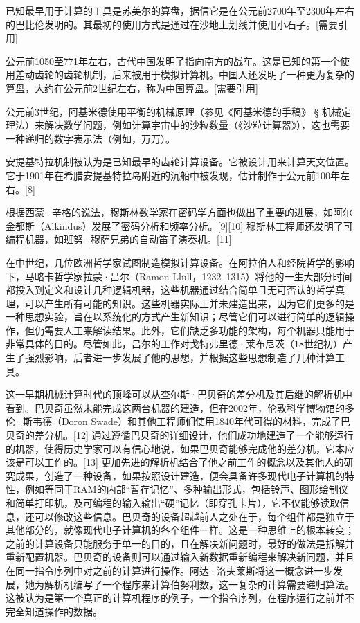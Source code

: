 已知最早用于计算的工具是苏美尔的算盘，据信它是在公元前2700年至2300年左右的巴比伦发明的。其最初的使用方式是通过在沙地上划线并使用小石子。[需要引用]

公元前1050至771年左右，古代中国发明了指向南方的战车。这是已知的第一个使用差动齿轮的齿轮机制，后来被用于模拟计算机。中国人还发明了一种更为复杂的算盘，大约在公元前2世纪左右，称为中国算盘。[需要引用]

公元前3世纪，阿基米德使用平衡的机械原理（参见《阿基米德的手稿》 § 机械定理法）来解决数学问题，例如计算宇宙中的沙粒数量（《沙粒计算器》），这也需要一种递归的数字表示法（例如，万万）。  

安提基特拉机制被认为是已知最早的齿轮计算设备。它被设计用来计算天文位置。它于1901年在希腊安提基特拉岛附近的沉船中被发现，估计制作于公元前100年左右。[8]

根据西蒙·辛格的说法，穆斯林数学家在密码学方面也做出了重要的进展，如阿尔金都斯（Alkindus）发展了密码分析和频率分析。[9][10] 穆斯林工程师还发明了可编程机器，如班努·穆萨兄弟的自动笛子演奏机。[11]

在中世纪，几位欧洲哲学家试图制造模拟计算设备。在阿拉伯人和经院哲学的影响下，马略卡哲学家拉蒙·吕尔（Ramon Llull，1232–1315）将他的一生大部分时间都投入到定义和设计几种逻辑机器，这些机器通过结合简单且无可否认的哲学真理，可以产生所有可能的知识。这些机器实际上并未建造出来，因为它们更多的是一种思想实验，旨在以系统化的方式产生新知识；尽管它们可以进行简单的逻辑操作，但仍需要人工来解读结果。此外，它们缺乏多功能的架构，每个机器只能用于非常具体的目的。尽管如此，吕尔的工作对戈特弗里德·莱布尼茨（18世纪初）产生了强烈影响，后者进一步发展了他的思想，并根据这些思想制造了几种计算工具。

这一早期机械计算时代的顶峰可以从查尔斯·巴贝奇的差分机及其后继的解析机中看到。巴贝奇虽然未能完成这两台机器的建造，但在2002年，伦敦科学博物馆的多伦·斯韦德（Doron Swade）和其他工程师们使用1840年代可得的材料，完成了巴贝奇的差分机。[12] 通过遵循巴贝奇的详细设计，他们成功地建造了一个能够运行的机器，使得历史学家可以有信心地说，如果巴贝奇能够完成他的差分机，它本应该是可以工作的。[13] 更加先进的解析机结合了他之前工作的概念以及其他人的研究成果，创造了一种设备，如果按照设计建造，便会具备许多现代电子计算机的特性，例如等同于RAM的内部“暂存记忆”、多种输出形式，包括铃声、图形绘制仪和简单打印机，及可编程的输入输出“硬”记忆（即穿孔卡片），它不仅能够读取信息，还可以修改这些信息。巴贝奇的设备超越前人之处在于，每个组件都是独立于其他部分的，就像现代电子计算机的各个组件一样。这是一种思维上的根本转变；之前的计算设备只能服务于单一的目的，且在解决新问题时，最好的做法是拆解并重新配置机器。巴贝奇的设备则可以通过输入新数据重新编程来解决新问题，并且在同一指令序列中对之前的计算进行操作。阿达·洛夫莱斯将这一概念进一步发展，她为解析机编写了一个程序来计算伯努利数，这一复杂的计算需要递归算法。这被认为是第一个真正的计算机程序的例子，一个指令序列，在程序运行之前并不完全知道操作的数据。

